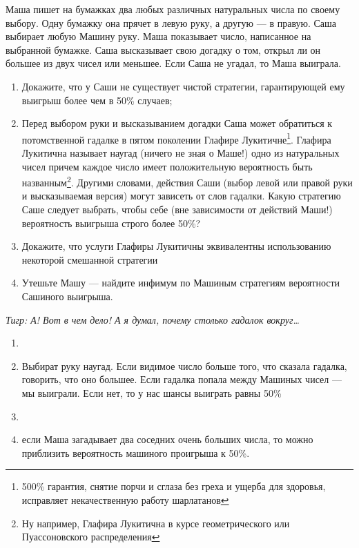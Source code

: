 \begin{problem} \par
\begin{source}  \cite{winkler:gpdp} \end{source}
Маша пишет на бумажках два любых различных натуральных числа по своему выбору. Одну бумажку она прячет в левую руку, а другую --- в правую. Саша выбирает любую Машину руку. Маша показывает число, написанное на выбранной бумажке. Саша высказывает свою догадку о том, открыл ли он большее из двух чисел или меньшее. Если Саша не угадал, то Маша выиграла.\par
\begin{enumerate}
\item Докажите, что у Саши не существует чистой стратегии, гарантирующей ему выигрыш более чем в 50\% случаев;\par
\item Перед выбором руки и высказыванием догадки Саша может обратиться к потомственной гадалке в пятом поколении Глафире Лукитичне\footnote{500\% гарантия, снятие порчи и сглаза без греха и ущерба для здоровья, исправляет некачественную работу шарлатанов}. Глафира Лукитична называет наугад (ничего не зная о Маше!) одно из натуральных чисел причем каждое число имеет положительную вероятность быть названным\footnote{Ну например, Глафира Лукитична в курсе геометрического или Пуассоновского распределения}. Другими словами, действия Саши (выбор левой или правой руки и высказываемая версия) могут зависеть от слов гадалки. Какую стратегию Саше следует выбрать, чтобы  себе (вне зависимости от действий Маши!) вероятность выигрыша строго более 50\%?\par
\item     Докажите, что услуги Глафиры Лукитичны эквивалентны использованию некоторой смешанной стратегии\par
\item     Утешьте Машу --- найдите инфимум по Машиным стратегиям вероятности Сашиного выигрыша.\par
\end{enumerate}
{\it Тигр: А! Вот в чем дело! А я думал, почему столько гадалок вокруг\ldots }



\begin{sol}
\begin{enumerate}
\item

\item Выбират руку наугад. Если видимое число больше того, что сказала гадалка, говорить, что оно большее. Если гадалка попала между Машиных чисел --- мы выиграли. Если нет, то у нас шансы выиграть равны 50\%

\item

\item если Маша загадывает два соседних очень больших числа, то можно приблизить вероятность машиного проигрыша к 50\%.
\end{enumerate}
\end{sol}
\end{problem}



